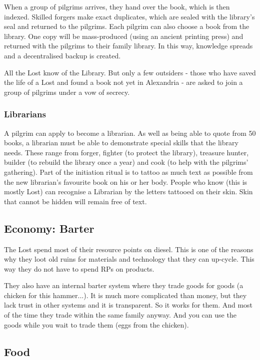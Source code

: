When a group of pilgrims arrives, they hand over the book, which is then indexed. Skilled forgers make exact duplicates, which are sealed with the library's seal and returned to the pilgrims. Each pilgrim can also choose a book from the library. One copy will be mass-produced (using an ancient printing press) and returned with the pilgrims to their family library.
In this way, knowledge spreads and a decentralised backup is created.

All the Lost know of the Library. But only a few outsiders - those who have saved the life of a Lost and found a book not yet in Alexandria - are asked to join a group of pilgrims under a vow of secrecy.

\subsubsection{Librarians}

A pilgrim can apply to become a librarian. As well as being able to quote from 50 books, a librarian must be able to demonstrate special skills that the library needs. These range from forger, fighter (to protect the library), treasure hunter, builder (to rebuild the library once a year) and cook (to help with the pilgrims' gathering).
Part of the initiation ritual is to tattoo as much text as possible from the new librarian's favourite book on his or her body. People who know (this is mostly Lost) can recognise a Librarian by the letters tattooed on their skin.
Skin that cannot be hidden will remain free of text.

\subsection{Economy: Barter}
\label{sec:Barter}
The Lost spend most of their resource points on diesel. This is one of the reasons why they loot old ruins for materials and technology that they can up-cycle. This way they do not have to spend RPs on products.

They also have an internal barter system where they trade goods for goods (a chicken for this hammer...).
It is much more complicated than money, but they lack trust in other systems and it is transparent. So it works for them. And most of the time they trade within the same family anyway.
And you can use the goods while you wait to trade them (eggs from the chicken).

\subsection{Food}
\label{sec:Lost food}

